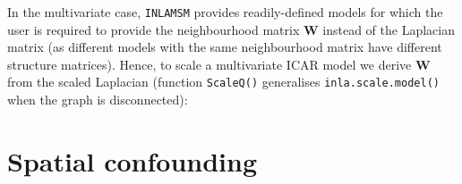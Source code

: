 \documentclass[openany]{book}
\begin{document}
In the multivariate case, \texttt{INLAMSM} provides readily-defined models for which the user is required to provide the neighbourhood matrix $\mathbf{W}$ instead of the Laplacian matrix (as different models with the same neighbourhood matrix have different structure matrices). Hence, to scale a multivariate ICAR model we derive  $\mathbf{W}$ from the scaled Laplacian (function \texttt{ScaleQ()}  generalises \texttt{inla.scale.model()} when the graph is disconnected):






\section{Spatial confounding}

\end{document}
